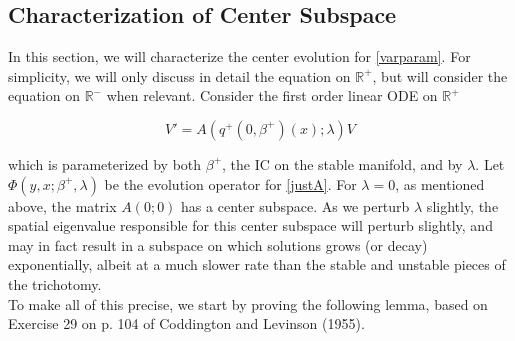 \documentclass[12pt]{article}
\def\R{{\mathbb R}}
\begin{document}
\subsection{Characterization of Center Subspace}

In this section, we will characterize the center evolution for \eqref{varparam}. For simplicity, we will only discuss in detail the equation on $\R^+$, but will consider the equation on $\R^-$ when relevant. Consider the first order linear ODE on $\R^+$

\begin{equation}\label{justA}
V' = A(q^+(0, \beta^+)(x); \lambda) V
\end{equation}

which is parameterized by both $\beta^+$, the IC on the stable manifold, and by $\lambda$. Let $\Phi(y, x; \beta^+, \lambda)$ be the evolution operator for \eqref{justA}. For $\lambda = 0$, as mentioned above, the matrix $A(0; 0)$ has a center subspace. As we perturb $\lambda$ slightly, the spatial eigenvalue responsible for this center subspace will perturb slightly, and may in fact result in a subspace on which solutions grows (or decay) exponentially, albeit at a much slower rate than the stable and unstable pieces of the trichotomy.\\

To make all of this precise, we start by proving the following lemma, based on Exercise 29 on p. 104 of Coddington and Levinson (1955).

\end{document}
